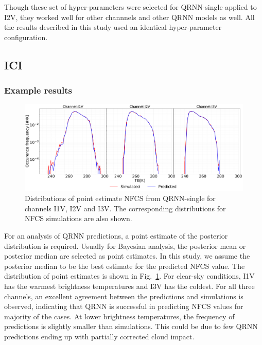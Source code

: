\documentclass[amt, manuscript]{copernicus}
\begin{document}
Though these set of hyper-parameters were selected for QRNN-single applied to I2V, they worked well for other channnels and other QRNN models as well. All the results described in this study used an identical hyper-parameter configuration.


\subsection{ICI}
\subsubsection{Example results}
%
\begin{figure}[t]
	\includegraphics[width=\textwidth]{Figures/PDF_predictions_ICI.pdf} 
	\caption{Distributions of point estimate NFCS from QRNN-single for channels I1V, I2V and I3V. The corresponding distributions for NFCS simulations are also shown.}
	\label{fig:PDF_predictions}	
\end{figure}

For an analysis of QRNN predictions, a point estimate of the posterior distribution is required. Usually for Bayesian analysis, the posterior mean or posterior median are selected as point estimates. In this study, we assume the posterior median to be the best estimate for the predicted NFCS value. The distribution of point estimates is shown in Fig.~\ref{fig:PDF_predictions}. For clear-sky conditions, I1V has the warmest brightness temperatures and I3V has the coldest. For all three channels, an excellent agreement between the predictions and simulations is observed, indicating that QRNN is successful in predicting NFCS values for majority of the cases. At lower brightness temperatures, the frequency of predictions is slightly smaller than simulations. This could be due to few QRNN predictions ending up with partially corrected cloud impact. 
 
\end{document}
